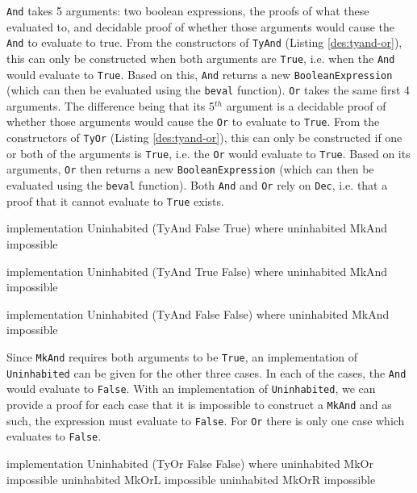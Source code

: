     \texttt{And} takes 5 arguments: two boolean expressions, the proofs of what these evaluated to, and decidable proof of whether those arguments would cause the \texttt{And} to evaluate to true. From the constructors of \texttt{TyAnd} (Listing \ref{des:tyand-or}), this can only be constructed when both arguments are \texttt{True}, i.e. when the \texttt{And} would evaluate to \texttt{True}. Based on this, \texttt{And} returns a new \texttt{BooleanExpression} (which can then be evaluated using the \texttt{beval} function). \texttt{Or} takes the same first 4 arguments. The difference being that its 5$^{th}$ argument is a decidable proof of whether those arguments would cause the \texttt{Or} to evaluate to \texttt{True}. From the constructors of \texttt{TyOr} (Listing \ref{des:tyand-or}), this can only be constructed if one or both of the arguments is \texttt{True}, i.e. the \texttt{Or} would evaluate to \texttt{True}. Based on its arguments, \texttt{Or} then returns a new \texttt{BooleanExpression} (which can then be evaluated using the \texttt{beval} function). Both \texttt{And} and \texttt{Or} rely on \texttt{Dec}, i.e. that a proof that it cannot evaluate to \texttt{True} exists.
    
    \begin{code}[caption={Impossible \texttt{And} cases}]
        implementation Uninhabited (TyAnd False True) where
            uninhabited MkAnd impossible
            
        implementation Uninhabited (TyAnd True False) where
            uninhabited MkAnd impossible
            
        implementation Uninhabited (TyAnd False False) where
            uninhabited MkAnd impossible
    \end{code}

    Since \texttt{MkAnd} requires both arguments to be \texttt{True}, an implementation of \texttt{Uninhabited} can be given for the other three cases. In each of the cases, the \texttt{And} would evaluate to \texttt{False}. With an implementation of \texttt{Uninhabited}, we can provide a proof for each case that it is impossible to construct a \texttt{MkAnd} and as such, the expression must evaluate to \texttt{False}. For \texttt{Or} there is only one case which evaluates to \texttt{False}.
    
    \begin{code}[label={des:or-uninh}, caption={The impossible \texttt{Or} case}]
        implementation Uninhabited (TyOr False False) where
            uninhabited MkOr  impossible
            uninhabited MkOrL impossible
            uninhabited MkOrR impossible
    \end{code}

